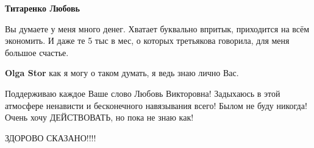 \begin{itemize}
\begin{itemize}
 
\textbf{Титаренко Любовь} 

Вы думаете у меня много денег. Хватает буквально впритык, приходится на всём
экономить. И даже те 5 тыс в мес, о которых третьякова говорила, для меня
большое счастье.


 
\textbf{Olga Stor} как я могу о таком думать, я ведь знаю лично Вас.
\end{itemize}

 
Поддерживаю каждое Ваше слово Любовь Викторовна! Задыхаюсь в этой атмосфере
ненависти и бесконечного навязывания всего! Былом не буду никогда! Очень хочу
ДЕЙСТВОВАТЬ, но пока не знаю как!

 
ЗДОРОВО СКАЗАНО!!!!

\end{itemize}

